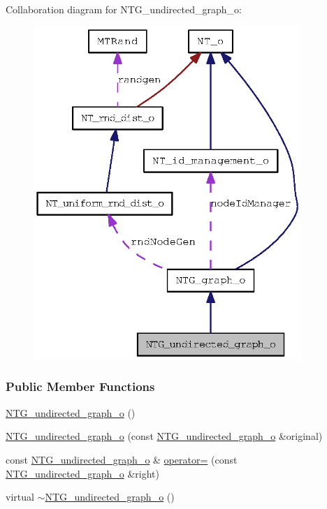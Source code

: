 Collaboration diagram for NTG\_\-undirected\_\-graph\_\-o:
\nopagebreak
\begin{figure}[H]
\begin{center}
\leavevmode
\includegraphics[width=287pt]{class_n_t_g__undirected__graph__o__coll__graph}
\end{center}
\end{figure}
\subsubsection*{Public Member Functions}
\begin{DoxyCompactItemize}
\item 
\hyperlink{class_n_t_g__undirected__graph__o_a45f8b0130f72945904a20785f4e2599f}{NTG\_\-undirected\_\-graph\_\-o} ()
\item 
\hyperlink{class_n_t_g__undirected__graph__o_a21d4ef8b4ac588eded2094d5f43c8c0f}{NTG\_\-undirected\_\-graph\_\-o} (const \hyperlink{class_n_t_g__undirected__graph__o}{NTG\_\-undirected\_\-graph\_\-o} \&original)
\item 
const \hyperlink{class_n_t_g__undirected__graph__o}{NTG\_\-undirected\_\-graph\_\-o} \& \hyperlink{class_n_t_g__undirected__graph__o_ab447c1ed07aa471c03cc15580f339bdb}{operator=} (const \hyperlink{class_n_t_g__undirected__graph__o}{NTG\_\-undirected\_\-graph\_\-o} \&right)
\item 
virtual \hyperlink{class_n_t_g__undirected__graph__o_a136f05e0fbcc31f2ac2979b3865bb4c5}{$\sim$NTG\_\-undirected\_\-graph\_\-o} ()
\end{DoxyCompactItemize}


